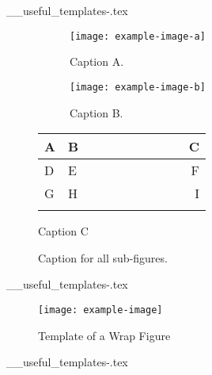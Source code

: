 \begin{filecontents*}{__useful_templates-\theusefultemplate.tex}
\begin{figure}[tph]
    \centering
    \begin{subfigure}{0.3\textwidth}
    \centering
    \texttt{[image: example-image-a]} %
    \caption{Caption A.}            %
    \label{subfig:subfig-example-a} %
    \end{subfigure}
    \hfill
    \begin{subfigure}{0.3\textwidth}
    \centering
    \texttt{[image: example-image-b]}
    \caption{Caption B.}
    \label{subfig:subfig-example-b}
    \end{subfigure}
    \hfill 
    \begin{subtable}[b]{0.3\textwidth}
        \begin{tabular}{L{0.1\linewidth} C{0.4\linewidth} r}
        \hhline{===} 
        \textbf{A} & \textbf{B} & \textbf{C}   \\ \hline 
        D & E & F   \\
        G & H & I   \\
        \hhline{===}
        \end{tabular}
        \caption{Caption C}
      \label{table:table}
  \end{subtable}
\caption{Caption for all sub-figures.}  %
\label{fig:subfig-example}              %
\end{figure}
\end{filecontents*}

\begin{filecontents*}{__useful_templates-\theusefultemplate.tex}
\begin{wrapfigure}{r}{0.4\linewidth}
    \centering
    \texttt{[image: example-image]}
    \caption{Template of a Wrap Figure}
    \label{fig:descriptive-label}
\end{wrapfigure}

\lipsum[1]
\end{filecontents*}


\begin{filecontents*}{__useful_templates-\theusefultemplate.tex}
\end{filecontents*}


